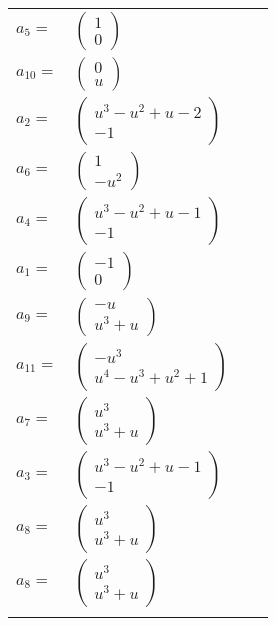 \documentclass[1p]{elsarticle_modified}
\theoremstyle{definition}
\begin{document}
\begin{tabular}{m{7pt} m{180pt} m{7pt} m{180pt} }
\flushright $a_{5}=$&$\begin{pmatrix}1\\0\end{pmatrix}$ \\
\flushright $a_{10}=$&$\begin{pmatrix}0\\u\end{pmatrix}$ \\
\flushright $a_{2}=$&$\begin{pmatrix}u^3- u^2+u-2\\-1\end{pmatrix}$ \\
\flushright $a_{6}=$&$\begin{pmatrix}1\\- u^2\end{pmatrix}$ \\
\flushright $a_{4}=$&$\begin{pmatrix}u^3- u^2+u-1\\-1\end{pmatrix}$ \\
\flushright $a_{1}=$&$\begin{pmatrix}-1\\0\end{pmatrix}$ \\
\flushright $a_{9}=$&$\begin{pmatrix}- u\\u^3+u\end{pmatrix}$ \\
\flushright $a_{11}=$&$\begin{pmatrix}- u^3\\u^4- u^3+u^2+1\end{pmatrix}$ \\
\flushright $a_{7}=$&$\begin{pmatrix}u^3\\u^3+u\end{pmatrix}$ \\
\flushright $a_{3}=$&$\begin{pmatrix}u^3- u^2+u-1\\-1\end{pmatrix}$ \\
\flushright $a_{8}=$&$\begin{pmatrix}u^3\\u^3+u\end{pmatrix}$\\ \flushright $a_{8}=$&$\begin{pmatrix}u^3\\u^3+u\end{pmatrix}$\\&\end{tabular}
\end{document}
